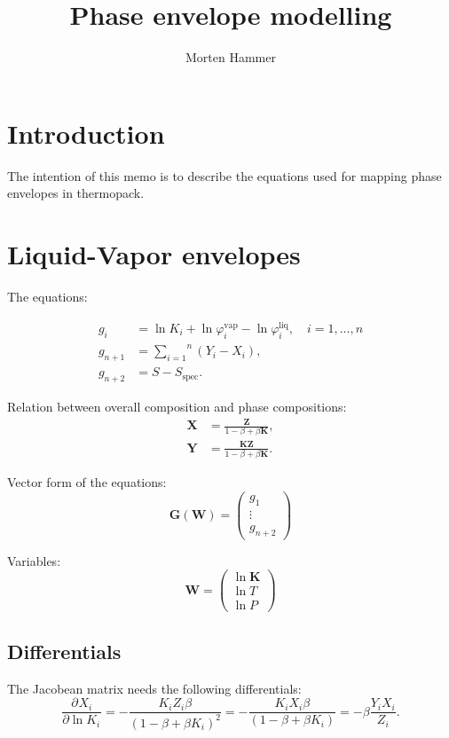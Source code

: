 \documentclass[english]{../thermomemo/thermomemo}
\title{Phase envelope modelling}
\author{Morten Hammer}
\newcommand*{\pd}[3][]{\frac{\partial^{#1}#2}{\partial{#3}^{#1}}}%
\newcommand*{\vektor}[1]{\boldsymbol{#1}}%
\newcommand{\spec}{\text{spec}}
\newcommand{\liq}{\text{liq}}
\newcommand{\vap}{\text{vap}}
\begin{document}
\frontmatter
\tableofcontents
\section{Introduction}
The intention of this memo is to describe the equations used for mapping phase envelopes in thermopack.


\section{Liquid-Vapor envelopes}

The equations:

\begin{align}
   g_i &= \ln K_i + \ln \varphi^\vap_i - \ln \varphi^\liq_i , \quad
   i=1,\dots,n \label{eq:fug_eq}\\
   g_{n+1} &= \overset{n}{\underset{i=1}{\sum}}\left(Y_i-X_i\right), \label{eq:sum_eq} \\
   g_{n+2} &= S - S_\spec \label{eq:spec_eq}.
\end{align}

Relation between overall composition and phase compositions:
\begin{align}
  \label{eq:comp1}
  \vektor{X} &= \frac{\vektor{Z}}{1-\beta+\beta \vektor{K}},\\
  \label{eq:comp2}
  \vektor{Y} &= \frac{\vektor{K}\vektor{Z}}{1-\beta+\beta \vektor{K}}.
\end{align}

Vector form of the equations:
\begin{equation}
  \label{eq:G}
  \vektor{G}\left(\vektor{W}\right) = \begin{pmatrix}
    g_1 \\
    \vdots \\
    g_{n+2}
  \end{pmatrix}
\end{equation}

Variables:
\begin{equation}
  \label{eq:W}
  \vektor{W} = \begin{pmatrix}
    \ln \vektor{K} \\
    \ln T \\
    \ln P
  \end{pmatrix}
\end{equation}
\subsection{Differentials}
The Jacobean matrix needs the following differentials:
\begin{equation}
   \pd{X_i}{\ln K_i} = -\frac{K_iZ_i\beta}{\left(1-\beta+\beta K_i\right)^2} = -\frac{K_iX_i\beta}{\left(1-\beta+\beta K_i\right)} = -\beta\frac{Y_iX_i}{Z_i}.
\end{equation}
\end{document}
